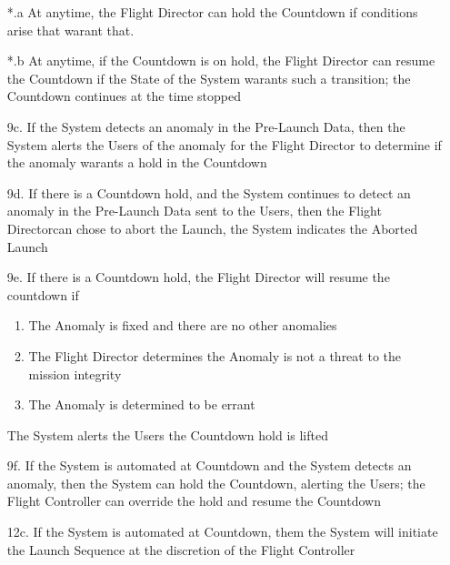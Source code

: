 \documentclass[letterpaper]{article}
\begin{document}
\begin{itemize}
\item[*.a]  At anytime, the Flight Director can hold the Countdown
if conditions arise that warant that.
\item[*.b] At anytime, if the Countdown is on hold, the Flight
Director can resume the Countdown if the State of the System warants
such a transition;  the Countdown continues at the time stopped
\item[9c.]  If the System detects an anomaly in the
Pre-Launch Data, then the System alerts the Users of the anomaly for
the Flight Director to determine if the anomaly warants a hold in the
Countdown
\item[9d.]  If there is a Countdown hold, and the System continues to
detect an anomaly in the Pre-Launch Data sent to the Users, then the
Flight Directorcan chose to abort the Launch, the System indicates the
Aborted Launch
\item[9e.]  If there is a Countdown hold, the Flight Director will
resume the countdown if
\begin{enumerate}
\item The Anomaly is fixed and there are no other anomalies
\item The Flight Director determines the Anomaly is not a threat
to the mission integrity
\item The Anomaly is determined to be errant
\end{enumerate}
The System alerts the Users the Countdown hold is lifted
\item[9f.] If the System is automated at Countdown and the System
detects an anomaly, then the System can hold the Countdown, alerting
the Users;  the Flight Controller can override the hold and resume the
Countdown
\item[12c.] If the System is automated at Countdown, them the System
will initiate the Launch Sequence at the discretion of the Flight
Controller
\end{itemize}
\end{document}
